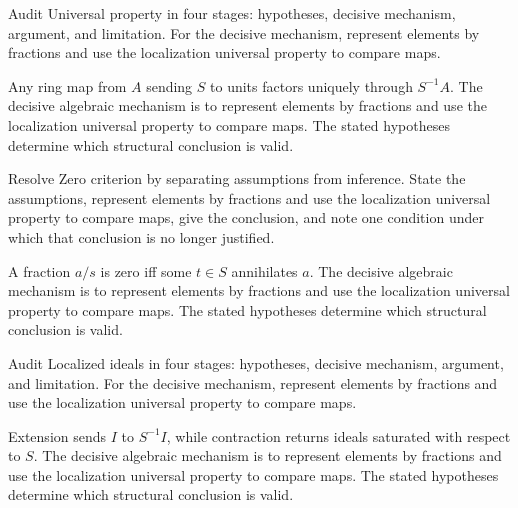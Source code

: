 \begin{problem}\label{prob:v06-problem-04}
Audit Universal property in four stages: hypotheses, decisive mechanism, argument, and limitation. For the decisive mechanism, represent elements by fractions and use the localization universal property to compare maps.
\end{problem}
\begin{solution}
Any ring map from $A$ sending $S$ to units factors uniquely through $S^{-1}A$. The decisive algebraic mechanism is to represent elements by fractions and use the localization universal property to compare maps. The stated hypotheses determine which structural conclusion is valid.
\end{solution}

\begin{problem}\label{prob:v06-problem-05}
Resolve Zero criterion by separating assumptions from inference. State the assumptions, represent elements by fractions and use the localization universal property to compare maps, give the conclusion, and note one condition under which that conclusion is no longer justified.
\end{problem}
\begin{solution}
A fraction $a/s$ is zero iff some $t\in S$ annihilates $a$. The decisive algebraic mechanism is to represent elements by fractions and use the localization universal property to compare maps. The stated hypotheses determine which structural conclusion is valid.
\end{solution}

\begin{problem}\label{prob:v06-problem-06}
Audit Localized ideals in four stages: hypotheses, decisive mechanism, argument, and limitation. For the decisive mechanism, represent elements by fractions and use the localization universal property to compare maps.
\end{problem}
\begin{solution}
Extension sends $I$ to $S^{-1}I$, while contraction returns ideals saturated with respect to $S$. The decisive algebraic mechanism is to represent elements by fractions and use the localization universal property to compare maps. The stated hypotheses determine which structural conclusion is valid.
\end{solution}

